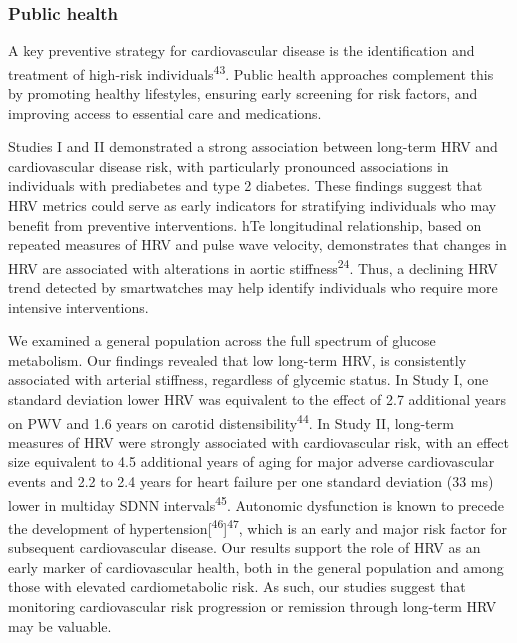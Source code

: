 \documentclass[
  a4paper,
  headsepline=true,
  open=any]{scrbook}
\begin{document}
\hypertarget{public-health}{%
\subsubsection{Public health}\label{public-health}}

A key preventive strategy for cardiovascular disease is the
identification and treatment of high-risk
individuals\textsuperscript{43}. Public health approaches complement
this by promoting healthy lifestyles, ensuring early screening for risk
factors, and improving access to essential care and medications.

Studies I and II demonstrated a strong association between long-term HRV
and cardiovascular disease risk, with particularly pronounced
associations in individuals with prediabetes and type 2 diabetes. These
findings suggest that HRV metrics could serve as early indicators for
stratifying individuals who may benefit from preventive interventions.
hTe longitudinal relationship, based on repeated measures of HRV and
pulse wave velocity, demonstrates that changes in HRV are associated
with alterations in aortic stiffness\textsuperscript{24}. Thus, a
declining HRV trend detected by smartwatches may help identify
individuals who require more intensive interventions.

We examined a general population across the full spectrum of glucose
metabolism. Our findings revealed that low long-term HRV, is
consistently associated with arterial stiffness, regardless of glycemic
status. In Study I, one standard deviation lower HRV was equivalent to
the effect of 2.7 additional years on PWV and 1.6 years on carotid
distensibility\textsuperscript{44}. In Study II, long-term measures of
HRV were strongly associated with cardiovascular risk, with an effect
size equivalent to 4.5 additional years of aging for major adverse
cardiovascular events and 2.2 to 2.4 years for heart failure per one
standard deviation (33 ms) lower in multiday SDNN
intervals\textsuperscript{45}. Autonomic dysfunction is known to precede
the development of
hypertension{[}\textsuperscript{46}{]}\textsuperscript{47}, which is an
early and major risk factor for subsequent cardiovascular disease. Our
results support the role of HRV as an early marker of cardiovascular
health, both in the general population and among those with elevated
cardiometabolic risk. As such, our studies suggest that monitoring
cardiovascular risk progression or remission through long-term HRV may
be valuable.
\end{document}
